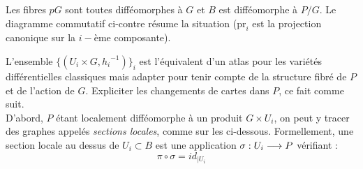 \begin{definition}
\begin{adjustbox}{valign=C,raise=1cm, minipage={1.1\linewidth}}
		Les fibres $pG$ sont toutes difféomorphes à $G$ et $B$ est difféomorphe à $P/G$. Le diagramme commutatif ci-contre résume la situation ($\text{pr}_i$ est la projection canonique sur la $i-$ème composante).
	\end{adjustbox}
\end{definition}
\skipl 


L'ensemble $\big\{(U_i\times G, {h_i}^{-1})\big\}_i$ est l'équivalent d'un atlas pour les variétés différentielles classiques mais adapter pour tenir compte de la structure fibré de $P$ et de l'action de $G$. Expliciter les changements de cartes dans $P$, ce fait comme suit.
\\
D'abord, $P$ étant localement difféomorphe à un produit $G\times U_i$, on peut y tracer des graphes appelés \emph{sections locales}, comme sur les  ci-dessous. Formellement, une section locale au dessus  de $U_i \subset B$ est une application $\sigma : U_i \longrightarrow P$ vérifiant :
\[\pi\circ \sigma = id_{{\displaystyle |}U_i}\]
\begin{figure}[H]
	\begin{floatrow}
		
	\end{floatrow}
\end{figure}
\noindent
